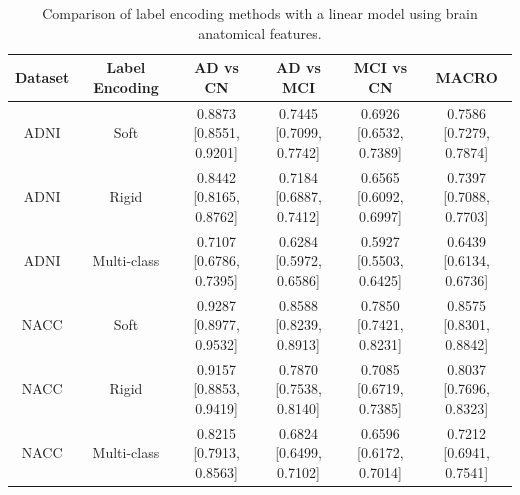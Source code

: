 \documentclass[pdflatex,sn-nature]{sn-jnl}%
\theoremstyle{thmstyleone}%
\theoremstyle{thmstyletwo}%
\theoremstyle{thmstylethree}%
\begin{document}
\begin{appendices}
\begin{table}[ht]
\centering
\begin{tabular}{c|c|c|c|c|c}
\hline
\textbf{Dataset} & \textbf{Label Encoding} & \textbf{AD vs CN} & \textbf{AD vs MCI} & \textbf{MCI vs CN} & \textbf{MACRO} \\
\hline
ADNI & Soft &
\makecell{0.8873\\{[0.8551, 0.9201]}} &
\makecell{0.7445\\{[0.7099, 0.7742]}} &
\makecell{0.6926\\{[0.6532, 0.7389]}} &
\makecell{0.7586\\{[0.7279, 0.7874]}}\\
ADNI & Rigid &
\makecell{0.8442\\{[0.8165, 0.8762]}} &
\makecell{0.7184\\{[0.6887, 0.7412]}} &
\makecell{0.6565\\{[0.6092, 0.6997]}} &
\makecell{0.7397\\{[0.7088, 0.7703]}}\\
ADNI & Multi-class &
\makecell{0.7107\\{[0.6786, 0.7395]}} &
\makecell{0.6284\\{[0.5972, 0.6586]}} &
\makecell{0.5927\\{[0.5503, 0.6425]}} &
\makecell{0.6439\\{[0.6134, 0.6736]}}\\
\hline
NACC & Soft &
\makecell{0.9287\\{[0.8977, 0.9532]}} &
\makecell{0.8588\\{[0.8239, 0.8913]}} &
\makecell{0.7850\\{[0.7421, 0.8231]}} &
\makecell{0.8575\\{[0.8301, 0.8842]}}\\
NACC & Rigid &
\makecell{0.9157\\{[0.8853, 0.9419]}} &
\makecell{0.7870\\{[0.7538, 0.8140]}} &
\makecell{0.7085\\{[0.6719, 0.7385]}} &
\makecell{0.8037\\{[0.7696, 0.8323]}}\\
NACC & Multi-class &
\makecell{0.8215\\{[0.7913, 0.8563]}} &
\makecell{0.6824\\{[0.6499, 0.7102]}} &
\makecell{0.6596\\{[0.6172, 0.7014]}} &
\makecell{0.7212\\{[0.6941, 0.7541]}}\\
\hline
\end{tabular}
\caption{Comparison of label encoding methods with a linear model using brain anatomical features.}
\label{tab:label_encoding_performance}
\end{table}




\end{appendices}
\end{document}
